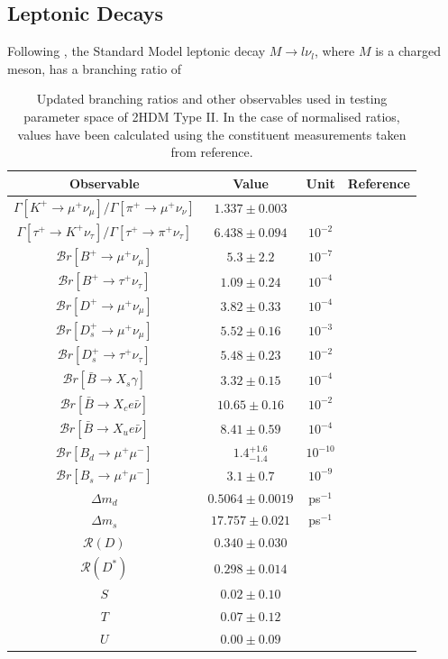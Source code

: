 \documentclass[a4paper,12pt]{article}
\begin{document}
\subsection{Leptonic Decays}
\label{subsec:lep}
Following \cite{desc}, the Standard Model leptonic decay $M\to l\nu_l$, where $M$ is a charged meson, has a branching ratio of
\begin{table}[ht]
    \centering
    \begin{tabular}{c|ccc}
        \hline\hline
        Observable & Value & Unit & Reference \\
        \hline\hline
        $\Gamma[K^+\to\mu^+\nu_\mu]/\Gamma[\pi^+\to\mu^+\nu_\nu]$ & $1.337\pm0.003$ & & \cite{pdg}\\
        $\Gamma[\tau^+\to K^+\nu_\tau]/\Gamma[\tau^+\to\pi^+\nu_\tau]$ & $6.438\pm0.094$ & $10^{-2}$ & \cite{pdg} \\
        $\mathcal{B}r[B^+\to\mu^+\nu_\mu]$ & $5.3\pm2.2$ & $10^{-7}$ & \cite{bmu} \\
        $\mathcal{B}r[B^+\to\tau^+\nu_\tau]$ & $1.09\pm0.24$ & $10^{-4}$ & \cite{pdg} \\
        $\mathcal{B}r[D^+\to\mu^+\nu_\mu]$ & $3.82\pm0.33$ & $10^{-4}$ & \cite{pdg} \\
        $\mathcal{B}r[D_s^+\to\mu^+\nu_\mu]$ & $5.52\pm0.16$ & $10^{-3}$ & \cite{pdg} \\
        $\mathcal{B}r[D_s^+\to\tau^+\nu_\tau]$ & $5.48\pm0.23$ & $10^{-2}$ & \cite{pdg} \\
        $\mathcal{B}r[\bar{B}\to X_s\gamma]$ & $3.32\pm0.15$ & $10^{-4}$ & \cite{hflav} \\
        $\mathcal{B}r[\bar{B}\to X_c e\bar{\nu}]$ & $10.65\pm0.16$ & $10^{-2}$ & \cite{hflav,pdg} \\
        $\mathcal{B}r[\bar{B}\to X_ue\bar{\nu}]$ & $8.41\pm0.59$ & $10^{-4}$ & \cite{bxu} \\
        $\mathcal{B}r[B_d\to\mu^+\mu^-]$ & $1.4^{+1.6}_{-1.4}$ & $10^{-10}$ & \cite{pdg} \\
        $\mathcal{B}r[B_s\to\mu^+\mu^-]$ & $3.1\pm0.7$ & $10^{-9}$ & \cite{hflav} \\
        $\Delta m_d$ & $0.5064\pm0.0019$ & ps$^{-1}$ & \cite{hflav} \\ 
        $\Delta m_s$ & $17.757\pm0.021$ & ps$^{-1}$ & \cite{hflav} \\
        $\mathcal{R}(D)$ & $0.340\pm0.030$ & & \cite{hflav} \\
        $\mathcal{R}(D^*)$ & $0.298\pm0.014$ & & \cite{hflav} \\
        $S$ & $0.02\pm0.10$ & & \cite{pdg} \\
        $T$ & $0.07\pm0.12$ & & \cite{pdg} \\
        $U$ & $0.00\pm0.09$ & & \cite{pdg} \\
        \hline\hline
    \end{tabular}
    \caption{\label{tab:branches}Updated branching ratios and other observables used in testing parameter space of 2HDM Type II. In the case of normalised ratios, values have been calculated using the constituent measurements taken from reference.}
\end{table}
\end{document}

